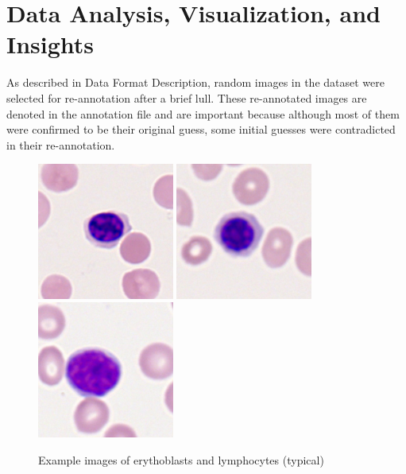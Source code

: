\documentclass[12pt]{article}
\newcommand\tab[1][1cm]{\hspace*{#1}}
\begin{document}
\newpage

\section{Data Analysis, Visualization, and Insights}
\tab As described in Data Format Description, random images in the dataset were selected for re-annotation after a brief lull. These re-annotated images are denoted in the annotation file and are important because although most of them were confirmed to be their original guess, some initial guesses were contradicted in their re-annotation.

\begin{figure}[!htb]
		\centering
		\includegraphics[width=0.4\textwidth]{EBO_0033.png}
		\includegraphics[width=0.4\textwidth]{EBO_0039.png}
		\includegraphics[width=0.4\textwidth]{LYT_0787.png}
		\caption{\label{: }Example images of erythoblasts and lymphocytes (typical)}
	\end{figure} 
\end{document}
